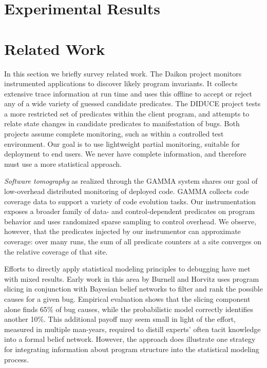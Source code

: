 \documentclass{sig-alternate}
\newcommand{\termdef}[1]{\textit{#1}}
\begin{document}
\section{Experimental Results}
\label{sec:experiments:results}



\section{Related Work}
\label{sec:related-work}

In this section we briefly survey related work.
The Daikon project \cite{ernst2001} monitors instrumented applications
to discover likely program invariants.  It collects extensive trace
information at run time and uses this offline to accept or reject any
of a wide variety of guessed candidate predicates.  The DIDUCE project
\cite{ICSE02*291} tests a more restricted set of predicates within the
client program, and attempts to relate state changes in candidate
predicates to manifestation of bugs.  Both projects assume complete
monitoring, such as within a controlled test environment.  Our goal is
to use lightweight partial monitoring, suitable for deployment to end
users.  We never have complete information, and therefore must use a
more statistical approach.

\termdef{Software tomography} as realized through the GAMMA system
\cite{PASTE'02*2,Orso:2003:LFDIART} shares our goal of low-overhead
distributed monitoring of deployed code.  GAMMA collects code coverage
data to support a variety of code evolution tasks.  Our
instrumentation exposes a broader family of data- and
control-dependent predicates on program behavior and uses randomized
sparse sampling to control overhead.  We observe, however, that the
predicates injected by our instrumentor can approximate coverage: over
many runs, the sum of all predicate counters at a site converges on
the relative coverage of that site.

Efforts to directly apply statistical modeling principles to debugging
have met with mixed results.  Early work in this area by Burnell and
Horvitz \cite{Burnell:1995:SCM} uses program slicing in conjunction
with Bayesian belief networks to filter and rank the possible causes
for a given bug.  Empirical evaluation shows that the slicing component
alone finds 65\% of bug causes, while the probabilistic model
correctly identifies another 10\%.  This additional payoff may seem
small in light of the effort, measured in multiple
man-years, required to distill experts' often tacit knowledge into a
formal belief network.  However, the approach does illustrate one
strategy for integrating information about program structure into the
statistical modeling process.
\end{document}
